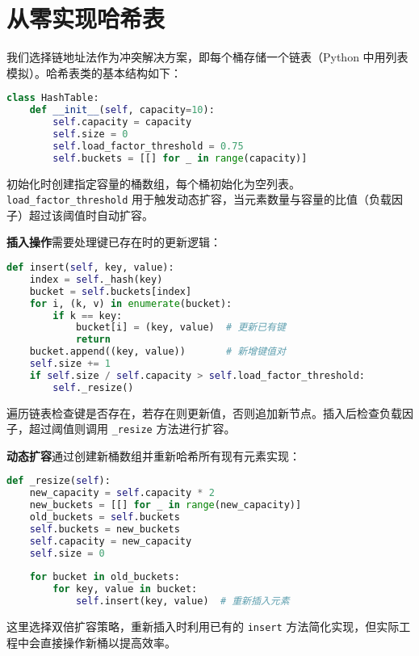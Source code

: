 \chapter{从零实现哈希表}
我们选择链地址法作为冲突解决方案，即每个桶存储一个链表（Python 中用列表模拟）。哈希表类的基本结构如下：\par
\begin{lstlisting}[language=python]
class HashTable:
    def __init__(self, capacity=10):
        self.capacity = capacity
        self.size = 0
        self.load_factor_threshold = 0.75
        self.buckets = [[] for _ in range(capacity)]
\end{lstlisting}
初始化时创建指定容量的桶数组，每个桶初始化为空列表。\verb!load_factor_threshold! 用于触发动态扩容，当元素数量与容量的比值（负载因子）超过该阈值时自动扩容。\par
\textbf{插入操作}需要处理键已存在时的更新逻辑：\par
\begin{lstlisting}[language=python]
def insert(self, key, value):
    index = self._hash(key)
    bucket = self.buckets[index]
    for i, (k, v) in enumerate(bucket):
        if k == key:
            bucket[i] = (key, value)  # 更新已有键
            return
    bucket.append((key, value))       # 新增键值对
    self.size += 1
    if self.size / self.capacity > self.load_factor_threshold:
        self._resize()
\end{lstlisting}
遍历链表检查键是否存在，若存在则更新值，否则追加新节点。插入后检查负载因子，超过阈值则调用 \verb!_resize! 方法进行扩容。\par
\textbf{动态扩容}通过创建新桶数组并重新哈希所有现有元素实现：\par
\begin{lstlisting}[language=python]
def _resize(self):
    new_capacity = self.capacity * 2
    new_buckets = [[] for _ in range(new_capacity)]
    old_buckets = self.buckets
    self.buckets = new_buckets
    self.capacity = new_capacity
    self.size = 0
    
    for bucket in old_buckets:
        for key, value in bucket:
            self.insert(key, value)  # 重新插入元素
\end{lstlisting}
这里选择双倍扩容策略，重新插入时利用已有的 \verb!insert! 方法简化实现，但实际工程中会直接操作新桶以提高效率。\par
